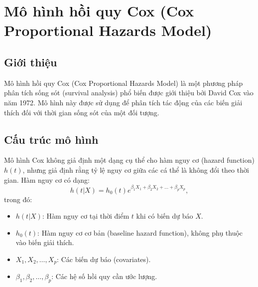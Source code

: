 \chapter{Mô hình hồi quy Cox (Cox Proportional Hazards Model)}
\section{Giới thiệu}
Mô hình hồi quy Cox (Cox Proportional Hazards Model) là một phương pháp phân tích sống sót (survival analysis) phổ biến được giới thiệu bởi David Cox vào năm 1972. Mô hình này được sử dụng để phân tích tác động của các biến giải thích đối với thời gian sống sót của một đối tượng.

\section{Cấu trúc mô hình}
Mô hình Cox không giả định một dạng cụ thể cho hàm nguy cơ (hazard function) $ h(t) $, nhưng giả định rằng tỷ lệ nguy cơ giữa các cá thể là không đổi theo thời gian. Hàm nguy cơ có dạng:
\begin{equation}
    h(t | X) = h_0(t) e^{\beta_1 X_1 + \beta_2 X_2 + \dots + \beta_p X_p},
\end{equation}
trong đó:
\begin{itemize}
    \item $ h(t | X) $: Hàm nguy cơ tại thời điểm $ t $ khi có biến dự báo $ X $.
    \item $ h_0(t) $: Hàm nguy cơ cơ bản (baseline hazard function), không phụ thuộc vào biến giải thích.
    \item $ X_1, X_2, \dots, X_p $: Các biến dự báo (covariates).
    \item $ \beta_1, \beta_2, \dots, \beta_p $: Các hệ số hồi quy cần ước lượng.
\end{itemize}


